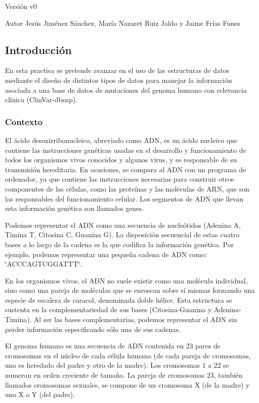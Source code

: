 \begin{DoxyVersion}{Versión}
v0 
\end{DoxyVersion}
\begin{DoxyAuthor}{Autor}
Jesús Jiménez Sánchez, María Nazaret Ruiz Jaldo y Jaime Frías Funes
\end{DoxyAuthor}
\hypertarget{index_introsec}{}\subsection{Introducción}\label{index_introsec}
En esta practica se pretende avanzar en el uso de las estructuras de datos mediante el diseño de distintos tipos de datos para manejar la información asociada a una base de datos de mutaciones del genoma humano con relevancia clínica (Clin\+Var-\/dbsnp).\hypertarget{index_background}{}\subsubsection{Contexto}\label{index_background}
El ácido desoxirribonucleico, abreviado como A\+DN, es un ácido nucleico que contiene las instrucciones genéticas usadas en el desarrollo y funcionamiento de todos los organismos vivos conocidos y algunos virus, y es responsable de su transmisión hereditaria. En ocasiones, se compara al A\+DN con un programa de ordenador, ya que contiene las instrucciones necesarias para construir otros componentes de las células, como las proteínas y las moléculas de A\+RN, que son las responsables del funcionamiento celular. Los segmentos de A\+DN que llevan esta información genética son llamados genes.

Podemos representar el A\+DN como una secuencia de nucleótidos (Adenina A, Timina T, Citosina C, Guanina G). La disposición secuencial de estas cuatro bases a lo largo de la cadena es la que codifica la información genética. Por ejemplo, podemos representar una pequeña cadena de A\+DN como\+: \char`\"{}\+A\+C\+C\+C\+A\+G\+T\+C\+G\+G\+A\+T\+T\+T\char`\"{}.

En los organismos vivos, el A\+DN no suele existir como una molécula individual, sino como una pareja de moléculas que se enroscan sobre sí mismas formando una especie de escalera de caracol, denominada doble hélice. Esta estructura se sustenta en la complementariedad de sus bases (Citosina-\/\+Guanina y Adenina-\/\+Timina). Al ser las bases complementarias, podemos representar el A\+DN sin perder información especificando sólo una de sus cadenas.

El genoma humano es una secuencia de A\+DN contenida en 23 pares de cromosomas en el núcleo de cada célula humana (de cada pareja de cromosomas, uno es heredado del padre y otro de la madre). Los cromosomas 1 a 22 se numeran en orden creciente de tamaño. La pareja de cromosomas 23, también llamados cromosomas sexuales, se compone de un cromosoma X (de la madre) y uno X o Y (del padre).

